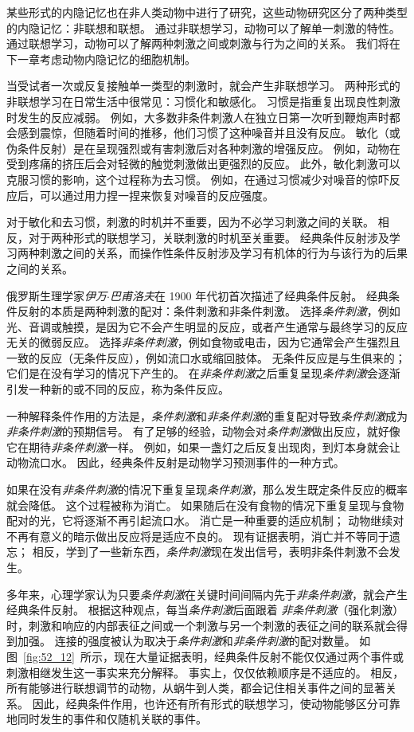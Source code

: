 某些形式的内隐记忆也在非人类动物中进行了研究，这些动物研究区分了两种类型的内隐记忆：非联想和联想。
通过非联想学习，动物可以了解单一刺激的特性。
通过联想学习，动物可以了解两种刺激之间或刺激与行为之间的关系。
我们将在下一章考虑动物内隐记忆的细胞机制。


当受试者一次或反复接触单一类型的刺激时，就会产生非联想学习。
两种形式的非联想学习在日常生活中很常见：习惯化和敏感化。
习惯是指重复出现良性刺激时发生的反应减弱。
例如，大多数非条件刺激人在独立日第一次听到鞭炮声时都会感到震惊，但随着时间的推移，他们习惯了这种噪音并且没有反应。
敏化（或伪条件反射）是在呈现强烈或有害刺激后对各种刺激的增强反应。
例如，动物在受到疼痛的挤压后会对轻微的触觉刺激做出更强烈的反应。
此外，敏化刺激可以克服习惯的影响，这个过程称为去习惯。
例如，在通过习惯减少对噪音的惊吓反应后，可以通过用力捏一捏来恢复对噪音的反应强度。


对于敏化和去习惯，刺激的时机并不重要，因为不必学习刺激之间的关联。
相反，对于两种形式的联想学习，关联刺激的时机至关重要。
经典条件反射涉及学习两种刺激之间的关系，而操作性条件反射涉及学习有机体的行为与该行为的后果之间的关系。


俄罗斯生理学家\textit{伊万$\cdot$巴甫洛夫}在 1900 年代初首次描述了经典条件反射。
经典条件反射的本质是两种刺激的配对：条件刺激和非条件刺激。
选择\textit{条件刺激}，例如光、音调或触摸，是因为它不会产生明显的反应，或者产生通常与最终学习的反应无关的微弱反应。
选择\textit{非条件刺激}，例如食物或电击，因为它通常会产生强烈且一致的反应（无条件反应），例如流口水或缩回肢体。
无条件反应是与生俱来的；
它们是在没有学习的情况下产生的。
在\textit{非条件刺激}之后重复呈现\textit{条件刺激}会逐渐引发一种新的或不同的反应，称为条件反应。


一种解释条件作用的方法是，\textit{条件刺激}和\textit{非条件刺激}的重复配对导致\textit{条件刺激}成为\textit{非条件刺激}的预期信号。
有了足够的经验，动物会对\textit{条件刺激}做出反应，就好像它在期待\textit{非条件刺激}一样。
例如，如果一盏灯之后反复出现肉，到灯本身就会让动物流口水。
因此，经典条件反射是动物学习预测事件的一种方式。


如果在没有\textit{非条件刺激}的情况下重复呈现\textit{条件刺激}，那么发生既定条件反应的概率就会降低。
这个过程被称为消亡。
如果随后在没有食物的情况下重复呈现与食物配对的光，它将逐渐不再引起流口水。
消亡是一种重要的适应机制；
动物继续对不再有意义的暗示做出反应将是适应不良的。
现有证据表明，消亡并不等同于遗忘；
相反，学到了一些新东西，\textit{条件刺激}现在发出信号，表明非条件刺激不会发生。


多年来，心理学家认为只要\textit{条件刺激}在关键时间间隔内先于\textit{非条件刺激}，就会产生经典条件反射。
根据这种观点，每当\textit{条件刺激}后面跟着 \textit{非条件刺激}（强化刺激）时，刺激和响应的内部表征之间或一个刺激与另一个刺激的表征之间的联系就会得到加强。
连接的强度被认为取决于\textit{条件刺激}和\textit{非条件刺激}的配对数量。
如图~\ref{fig:52_12}~所示，现在大量证据表明，经典条件反射不能仅仅通过两个事件或刺激相继发生这一事实来充分解释。
事实上，仅仅依赖顺序是不适应的。
相反，所有能够进行联想调节的动物，从蜗牛到人类，都会记住相关事件之间的显著关系。
因此，经典条件作用，也许还有所有形式的联想学习，使动物能够区分可靠地同时发生的事件和仅随机关联的事件。


